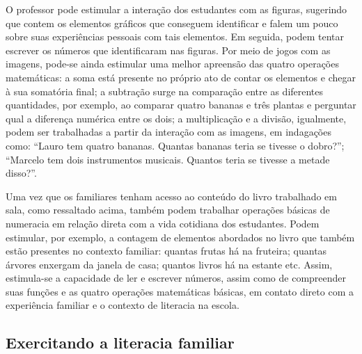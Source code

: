 \documentclass[11pt]{extarticle}
\begin{document}
O professor pode estimular a interação dos estudantes com as figuras, sugerindo que contem os elementos gráficos que conseguem identificar e falem um pouco sobre suas experiências pessoais com tais elementos. Em seguida, podem tentar escrever os números que identificaram nas figuras. Por meio de jogos com as imagens, pode-se ainda estimular uma melhor apreensão das quatro operações matemáticas: a soma está presente no próprio ato de contar os elementos e chegar à sua somatória final; a subtração surge na comparação entre as diferentes quantidades, por exemplo, ao comparar quatro bananas e três plantas e perguntar qual a diferença numérica entre os dois; a multiplicação e a divisão, igualmente, podem ser trabalhadas a partir da interação com as imagens, em indagações como: ``Lauro tem quatro bananas. Quantas bananas teria se tivesse o dobro?''; ``Marcelo tem dois instrumentos musicais. Quantos teria se tivesse a metade disso?''.

Uma vez que os familiares tenham acesso ao conteúdo do livro trabalhado em sala, como ressaltado acima, também podem trabalhar operações básicas de numeracia em relação direta com a vida cotidiana dos estudantes. Podem estimular, por exemplo, a contagem de elementos abordados no livro que também estão presentes no contexto familiar: quantas frutas há na fruteira; quantas árvores enxergam da janela de casa; quantos livros há na estante etc. Assim, estimula-se a capacidade de ler e escrever números, assim como de compreender suas funções e as quatro operações matemáticas básicas, em contato direto com a experiência familiar e o contexto de literacia na escola.

\subsection{Exercitando a literacia familiar}

\end{document}
